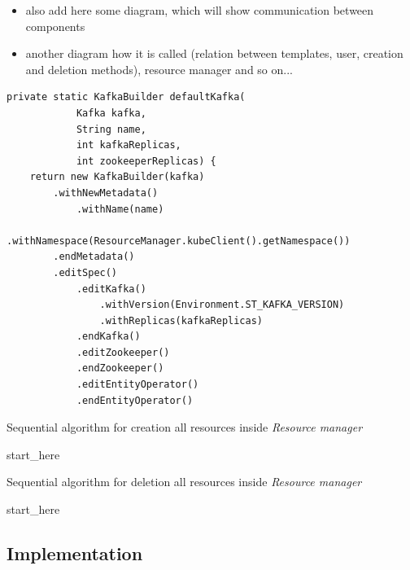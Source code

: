 \begin{itemize}[itemsep=1mm, parsep=0pt]
    \item also add here some diagram, which will show communication between components
    \item another diagram how it is called (relation between templates, user, creation and deletion methods), resource manager and so on...
\end{itemize}

\begin{verbatim}
private static KafkaBuilder defaultKafka(
            Kafka kafka,
            String name,
            int kafkaReplicas,
            int zookeeperReplicas) {
    return new KafkaBuilder(kafka)
        .withNewMetadata()
            .withName(name)
            .withNamespace(ResourceManager.kubeClient().getNamespace())
        .endMetadata()
        .editSpec()
            .editKafka()
                .withVersion(Environment.ST_KAFKA_VERSION)
                .withReplicas(kafkaReplicas)
            .endKafka()
            .editZookeeper()
            .endZookeeper()
            .editEntityOperator()
            .endEntityOperator()
\end{verbatim}

\begin{algorithm}[H]
    \label{01:alg:dsds}
    \caption{Sequential algorithm for creation all resources inside \emph{Resource manager}}

    \begin{algorithmic}[1]
        \State start\_here
    \end{algorithmic}
\end{algorithm}


\begin{algorithm}[H]
    \label{01:alg:dsdsd+}
    \caption{Sequential algorithm for deletion all resources inside \emph{Resource manager}}

    \begin{algorithmic}[1]
        \State start\_here
    \end{algorithmic}
\end{algorithm}


\subsection*{Implementation}